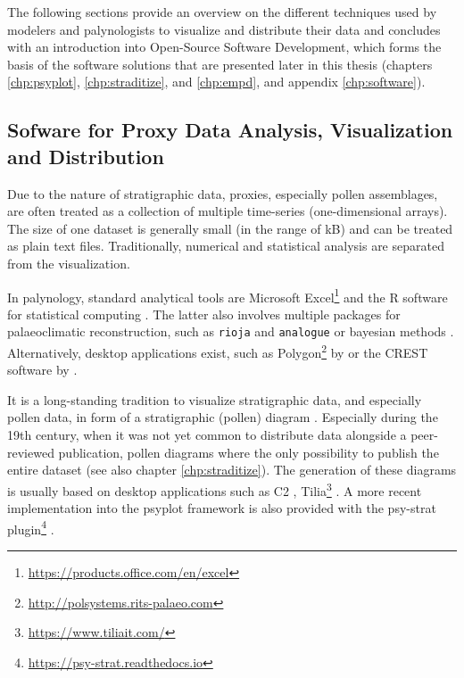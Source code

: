 \begin{refsection}
The following sections provide an overview on the different techniques used by modelers and palynologists to visualize and distribute their data and concludes with an introduction into Open-Source Software Development, which forms the basis of the software solutions that are presented later in this thesis (chapters \ref{chp:psyplot}, \ref{chp:straditize}, and \ref{chp:empd}, and appendix \ref{chp:software}).

\subsection{Sofware for Proxy Data Analysis, Visualization and Distribution} \label{sec:intro-software-data}
Due to the nature of stratigraphic data, proxies, especially pollen assemblages, are often treated as a collection of multiple time-series (one-dimensional arrays). The size of one dataset is generally small (in the range of kB) and can be treated as plain text files. Traditionally, numerical and statistical analysis are separated from the visualization. 

In palynology, standard analytical tools are Microsoft Excel\footnote{\url{https://products.office.com/en/excel}} and the R software for statistical computing \citep{RCT2019}. The latter also involves multiple packages for palaeoclimatic reconstruction, such as \texttt{rioja} \citep{Juggins2017} and \texttt{analogue} \citep{SimpsonOksanen2019, Simpson2007} or bayesian methods \citep{NolanTiptonBoothEtAl2019, Tipton2017}. Alternatively, desktop applications exist, such as Polygon\footnote{\url{http://polsystems.rits-palaeo.com}} by \cite{NakagawaTarasovNishidaEtAl2002} or the CREST software by \cite{ChevalierCheddadiChase2014, Chevalier2019}.

It is a long-standing tradition to visualize stratigraphic data, and especially pollen data, in form of a stratigraphic (pollen) diagram \citep{Bradley1985, Grimm1988}. Especially during the 19th century, when it was not yet common to distribute data alongside a peer-reviewed publication, pollen diagrams where the only possibility to publish the entire dataset (see also chapter \ref{chp:straditize}). The generation of these diagrams is usually based on desktop applications such as C2 \citep{Juggins2007}, Tilia\footnote{\url{https://www.tiliait.com/}} \citep{Grimm1988, Grimm1991}. A more recent implementation into the psyplot framework \citep[chapter \ref{chp:psyplot}]{Sommer2017} is also provided with the psy-strat plugin\footnote{\url{https://psy-strat.readthedocs.io}} \citep{Sommer2019}.


\end{refsection}
